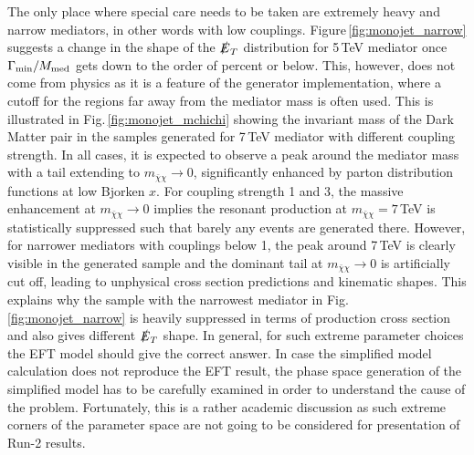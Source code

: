 The only place where special care needs to be taken are extremely heavy and narrow mediators, in other words with low couplings. Figure\,\ref{fig:monojet_narrow} suggests a change in the shape of the $\slashed{E}_T$ distribution for 5\,TeV mediator once $\Gamma_{\rm{min}}/M_{\rm{med}}$ gets down to the order of percent or below.
This, however, does not come from physics as it is a feature of the generator implementation, where a cutoff for the regions far away from the mediator mass is often used. This is illustrated in Fig.\,\ref{fig:monojet_mchichi} showing the invariant mass of the Dark Matter pair in the samples generated for 7\,TeV mediator with different coupling strength. In all cases, it is expected to observe a peak around the mediator mass with a tail extending to $m_{\bar{\chi}\chi}\rightarrow0$, significantly enhanced by parton distribution functions at low Bjorken $x$. For coupling strength 1 and 3, the massive enhancement at $m_{\bar{\chi}\chi}\rightarrow0$ implies the resonant production at $m_{\bar{\chi}\chi}=7$\,TeV is statistically suppressed such that barely any events are generated there. However, for narrower mediators with couplings below 1, the peak around 7\,TeV is clearly visible in the generated sample and the dominant tail at $m_{\bar{\chi}\chi}\rightarrow0$ is artificially cut off, leading to unphysical cross section predictions and kinematic shapes. This explains why the sample with the narrowest mediator in Fig.\,\ref{fig:monojet_narrow} is heavily suppressed in terms of production cross section and also gives different $\slashed{E}_T$ shape.
In general, for such extreme parameter choices
the EFT model should give the correct answer. In case the simplified model calculation does not reproduce the EFT result, the phase space generation of the simplified model has to be carefully examined in order to understand the cause of the problem. Fortunately, this is a rather academic discussion as such extreme corners of the parameter space are not going to be considered for presentation of Run-2 results.

%
%

